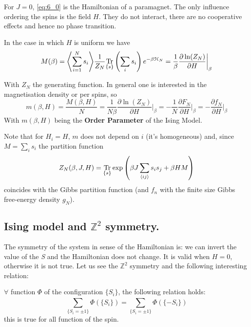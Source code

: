 \documentclass[../../Main/Main.tex]{subfiles}
\begin{document}
\begin{remark}
For \( J=0 \), \eqref{eq:6_0}  is the Hamiltonian of a paramagnet. The only influence ordering the spins is the field \( H \). They do not interact, there are no cooperative effects and hence no phase transition.
\end{remark}




In the case in which $H$ is uniform we have
$$M(\beta) = {\left< \sum_{i=1}^{N}s_{i} \right>}  \frac{1}{Z_{N}}\underset{\{ s \}}{\text{Tr}}\left( \sum_{i}s_{i} \right)e^{-\beta \mathcal{H}_{N}} = \frac{1}{\beta} \frac{ \partial \ln(Z_{N}) }{ \partial H  }\bigg\rvert_{\beta} $$

With $Z_{N}$ the generating function.
In general one is interested in the magnetisation density or per spins, so
$$m(\beta,H) = \frac{M(\beta,H)}{N} = \frac{1}{N\beta} \frac{ \partial \ln(Z_{N}) }{ \partial H  }\bigg\rvert_{\beta} = -\frac{1}{N} \frac{ \partial F_{N} }{ \partial H  }\bigg\rvert_{\beta} = -\frac{ \partial f_{N} }{ \partial H  }\bigg\rvert_{\beta} $$
With $m(\beta,H)$ being the \textbf{Order Parameter} of the Ising Model.

Note that for $H_{i} = H$, $m$ does not depend on $i$ (it's homogeneous) and, since $M = \sum_{i}s_{i}$ the partition function $$Z_{N}(\beta,J,H) = \underset{\{ s \}}{\text{Tr}} \exp\left( \beta J \sum_{{\left<  {ij} \right>}}s_{i}s_{j} + \beta HM \right)$$
coincides with the Gibbs partition function (and $f_{n}$ with the finite size Gibbs free-energy density $g_N$).


\subsection{Ising model and \( \mathbb{Z}^2 \) symmetry. }
The symmetry of the system in sense of the Hamiltonian is: we can invert the value of the \emph{S} and the Hamiltonian does not change. It is valid when \( H=0 \), otherwise it is not true. Let us see the \( \mathbb{Z}^2 \) symmetry and the following interesting relation:

  \begin{lemma}{}{}
  \( \forall  \) function \( \Phi  \) of the configuration \( \{ S_i \}   \), the following relation holds:
  \begin{equation}
    \sum_{ \{S_i = \pm 1\}}^{}  \Phi  (\{S_i\} ) =   \sum_{ \{S_i = \pm 1\}}^{}  \Phi  (\{-S_i\} )
      \label{eq:6_1}
  \end{equation}
  this is true for all function of the spin.
  \end{lemma}
\end{document}

